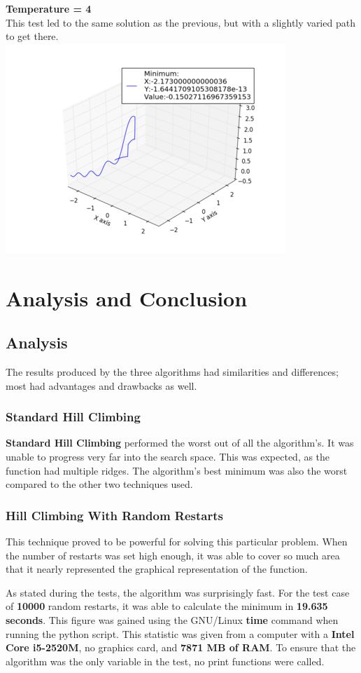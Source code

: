 \documentclass[]{report}
\begin{document}
	\textbf{Temperature = 4}\\
	This test led to the same solution as the previous, but with a slightly varied path to get there.\\
	\includegraphics{sa4}
	
	\chapter{Analysis and Conclusion}
	\section{Analysis}
	The results produced by the three algorithms had similarities and differences; most had advantages and drawbacks as well.
	\subsection{Standard Hill Climbing}
	\textbf{Standard Hill Climbing} performed the worst out of all the algorithm's. It was unable to progress very far into the search space. This was expected, as the function had multiple ridges. The algorithm's best minimum was also the worst compared to the other two techniques used.
	\subsection{Hill Climbing With Random Restarts}
	This technique proved to be powerful for solving this particular problem. When the number of restarts was set high enough, it was able to cover so much area that it nearly represented the graphical representation of the function. 
	
	As stated during the tests, the algorithm was surprisingly fast. For the test case of \textbf{10000} random restarts, it was able to calculate the minimum in \textbf{19.635 seconds}. This figure was gained using the GNU/Linux \textbf{time} command when running the python script. This statistic was given from a computer with a \textbf{Intel Core i5-2520M}, no graphics card, and \textbf{7871 MB of RAM}. To ensure that the algorithm was the only variable in the test, no print functions were called.
	
\end{document}
